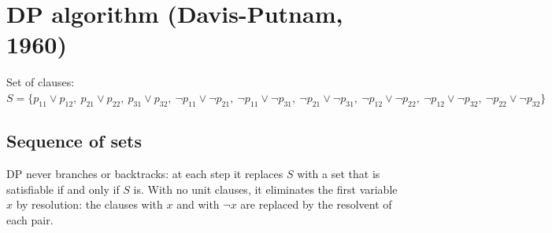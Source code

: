 \documentclass[a4paper,11pt]{article}
\begin{document}
\section*{DP algorithm (Davis-Putnam, 1960)}

Set of clauses: $S = \{p_{11} \lor p_{12},\allowbreak\ p_{21} \lor p_{22},\allowbreak\ p_{31} \lor p_{32},\allowbreak\ \neg p_{11} \lor \neg p_{21},\allowbreak\ \neg p_{11} \lor \neg p_{31},\allowbreak\ \neg p_{21} \lor \neg p_{31},\allowbreak\ \neg p_{12} \lor \neg p_{22},\allowbreak\ \neg p_{12} \lor \neg p_{32},\allowbreak\ \neg p_{22} \lor \neg p_{32}\}$

\subsection*{Sequence of sets}

DP never branches or backtracks: at each step it replaces $S$ with a set that is satisfiable if and only if $S$ is. With no unit clauses, it eliminates the first variable $x$ by resolution: the clauses with $x$ and with $\neg x$ are replaced by the resolvent of each pair.
\end{document}
